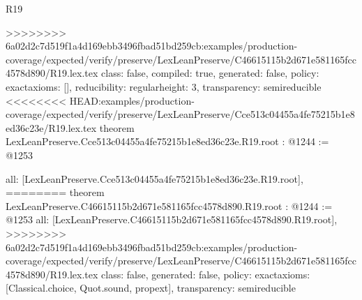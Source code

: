 \begin{lexlean}{R19}
\begin{coremodule}
{{{{{{{{{{{{{{>>>>>>>> 6a02d2c7d519f1a4d169ebb3496fbad51bd259cb:examples/production-coverage/expected/verify/preserve/LexLeanPreserve/C46615115b2d671e581165fcc4578d890/R19.lex.tex
  class: false,
  compiled: true,
  generated: false,
  policy: exact{axioms: []},
  reducibility: regular{height: 3},
  transparency: semireducible
}
<<<<<<<< HEAD:examples/production-coverage/expected/verify/preserve/LexLeanPreserve/Cce513c04455a4fe75215b1e8ed36c23e/R19.lex.tex
theorem LexLeanPreserve.Cce513c04455a4fe75215b1e8ed36c23e.R19.root : @1244 := @1253 {
  all: [LexLeanPreserve.Cce513c04455a4fe75215b1e8ed36c23e.R19.root],
========
theorem LexLeanPreserve.C46615115b2d671e581165fcc4578d890.R19.root : @1244 := @1253 {
  all: [LexLeanPreserve.C46615115b2d671e581165fcc4578d890.R19.root],
>>>>>>>> 6a02d2c7d519f1a4d169ebb3496fbad51bd259cb:examples/production-coverage/expected/verify/preserve/LexLeanPreserve/C46615115b2d671e581165fcc4578d890/R19.lex.tex
  class: false,
  generated: false,
  policy: exact{axioms: [Classical.choice, Quot.sound, propext]},
  transparency: semireducible
}

}}}}}}}}}}}}}}
\end{coremodule}
\end{lexlean}
